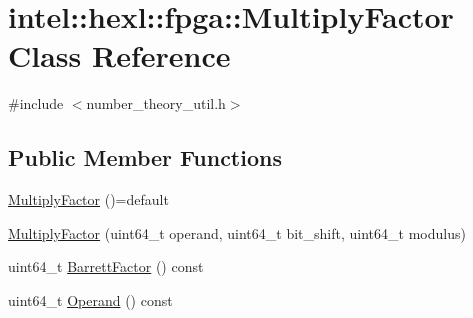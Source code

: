 \hypertarget{classintel_1_1hexl_1_1fpga_1_1MultiplyFactor}{\section{intel\-:\-:hexl\-:\-:fpga\-:\-:Multiply\-Factor Class Reference}
\label{classintel_1_1hexl_1_1fpga_1_1MultiplyFactor}
}


{\ttfamily \#include $<$number\-\_\-theory\-\_\-util.\-h$>$}

\subsection*{Public Member Functions}
\begin{DoxyCompactItemize}
\item 
\hyperlink{classintel_1_1hexl_1_1fpga_1_1MultiplyFactor_aec4f895b6ede16736951ed97c6d07936}{Multiply\-Factor} ()=default
\item 
\hyperlink{classintel_1_1hexl_1_1fpga_1_1MultiplyFactor_a3c0cc8fced8ac81e2a74e1fbda837ee6}{Multiply\-Factor} (uint64\-\_\-t operand, uint64\-\_\-t bit\-\_\-shift, uint64\-\_\-t modulus)
\item 
uint64\-\_\-t \hyperlink{classintel_1_1hexl_1_1fpga_1_1MultiplyFactor_aa14e2b825d1b951f5e1d1d0fb615f0bf}{Barrett\-Factor} () const 
\item 
uint64\-\_\-t \hyperlink{classintel_1_1hexl_1_1fpga_1_1MultiplyFactor_a70eefb9d515e068988d83ccf47a32c26}{Operand} () const 
\end{DoxyCompactItemize}


